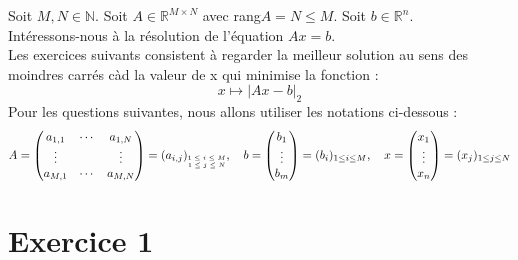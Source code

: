 \documentclass[a4paper, 10pt]{article}
\newcommand{\IR}{\mathbb{R}}
\newcommand{\IN}{\mathbb{N}}
\begin{document}
\renewcommand{\contentsname}{Table des matières}
\tableofcontents

\newpage

\noindent
Soit \( M, N \in \IN \). Soit \( A \in \IR^{M \times N} \) avec rang\( A = N \leq M \). Soit \( b \in \mathbb{R}^n \). \\
Intéressons-nous à la résolution de l'équation \( Ax = b \). \\
Les exercices suivants consistent à regarder la meilleur solution au sens des moindres carrés càd la valeur de x qui minimise la fonction :
\begin{equation}
    \label{eq:1}
    x \mapsto |Ax - b|_2
\end{equation}
Pour les questions suivantes, nous allons utiliser les notations ci-dessous :
$$
A =
\begin{pmatrix}
a_{1, 1} & \cdots & a_{1, N} \\
\vdots   &        & \vdots \\
a_{M, 1} & \cdots & a_{M, N}
\end{pmatrix}
= (a_{i, j})_{
\tiny \begin{matrix}
1 \leq i \leq M \\
1 \leq j \leq N
\end{matrix}}
, \quad b =
\begin{pmatrix}
b_1 \\
\vdots \\
b_m
\end{pmatrix}
= (b_i)_{1 \leq i \leq M}, \quad x =
\begin{pmatrix} x_1 \\
\vdots \\
x_n
\end{pmatrix}
= (x_j)_{1 \leq j \leq N}
$$

\section{Exercice 1}
\end{document}
